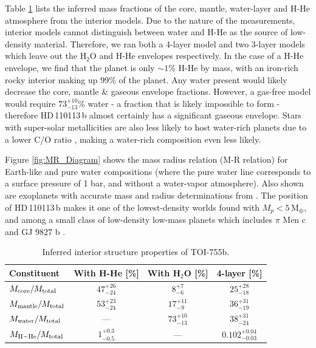 \documentclass[fleqn,usenatbib]{mnras}
\newcommand{\mearth}{M$_{\oplus}$}
\newcommand{\Tplanet}{HD\,110113\,b}
\begin{document}
Table \ref{tab:interior} lists the inferred mass fractions of the core, mantle, water-layer and H-He atmosphere from the interior models.
Due to the nature of the measurements, interior models cannot distinguish between water and H-He as the source of low-density material. 
Therefore, we ran both a 4-layer model and two 3-layer models which leave out the H$_{2}$O and H-He envelopes respectively.
In the case of a H-He envelope, we find that the planet is only $\sim1$\% H-He by mass, with an iron-rich rocky interior making up 99\% of the planet.
Any water present would likely decrease the core, mantle \& gaseous envelope fractions.
However, a gas-free model would require $73 ^{+10} _{-13}$\% water - a fraction that is likely impossible to form - therefore \Tplanet{} almost certainly has a significant gaseous envelope.
Stars with super-solar metallicities are also less likely to host water-rich planets due to a lower C/O ratio \citep{bitsch2020influence}, making a water-rich composition even less likely.

Figure \ref{fig:MR_Diagram} shows the mass radius relation (M-R relation) for Earth-like and pure water compositions (where the pure water line corresponds to a surface pressure of 1 bar, and without a water-vapor atmosphere).
Also shown are exoplanets with accurate mass and radius determinations from \citet{otegi2020revisited}.
The position of \Tplanet{} makes it one of the lowest-density worlds found with $M_p<5$\,\mearth{}, and among a small class of low-density low-mass planets which includes $\pi{}$ Men c \citep{huang2018tess} and GJ 9827 b \citep{niraula2017three}.

\begin{table}
\caption{Inferred interior structure properties of TOI-755b.}
\label{tab:interior}
\begin{tabular}{lccc}
\hline
\hline
Constituent & With H-He [\%] & With H$_{2}$O [\%] & 4-layer [\%] \\
\hline
\hline
$M_{\rm core}/M_{\rm total}$ & $47 ^{+26} _{-24} $ & $8 ^{+7} _{-6}$ & $25 ^{+28} _{-18}$\\
$M_{\rm mantle}/M_{\rm total}$ & $ 53 ^{+23} _{-24} $ & $17 ^{+11} _{-9}$ & $36 ^{+31} _{-19}$\\
$M_{\rm water}/M_{\rm total}$ & --- & $73 ^{+10} _{-13}$ & $38 ^{+31} _{-24}$\\
$M_{\rm H-He}/M_{\rm total}$ & $1 ^{+0.3} _{-0.5}$ & --- & $0.102  ^{+0.04} _{-0.03}$\\
\hline
\hline
\end{tabular}
\end{table}
\end{document}
